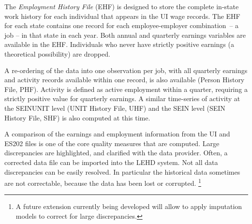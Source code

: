 
%
%


\label{sec:ehf_overview}


The \textit{Employment History File} (EHF)%
is designed to store the complete in-state work
history for each individual that appears in the UI%
 wage records. The EHF for each state contains one record for each
employee-employer combination~-- a job --  in that state in each
year.
  Both annual and quarterly earnings variables are available in
the EHF. Individuals who never have strictly positive earnings (a
theoretical possibility) are dropped. 

A re-ordering of the data into one observation per
job, with all quarterly earnings and activity records available within one record, is
also available (Person History File, PHF). Activity is defined
as active employment within a quarter, requiring a strictly positive value
for quarterly earnings. A similar time-series of activity at the SEINUNIT level (UNIT History
File, UHF) and the SEIN level (SEIN History File,
SHF) is also computed at this time. 

A comparison of the earnings and employment information from the UI and
ES202 files is one of the core quality measures that are computed. Large
discrepancies are highlighted, and clarified with the data provider. Often,
a corrected data file can be imported into the LEHD system. Not
all data discrepancies can be easily resolved. In particular the historical
data sometimes are not correctable, because the data has been lost or
corrupted.%
%
\footnote{A future extension currently being developed will allow to apply
imputation models to correct for large discrepancies.}
%



